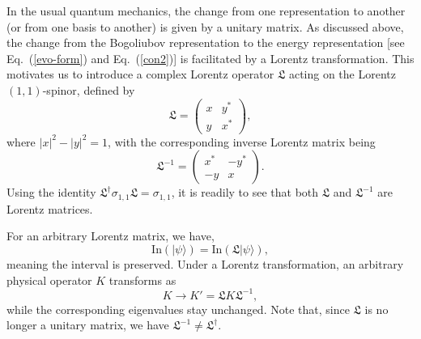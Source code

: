 \documentclass[pra,epsfig,rotate,superscriptaddress,showpacs]{revtex4}
\begin{document}
In the usual quantum mechanics, the change from one representation
to another (or from one basis to another) is given by a unitary matrix.
As discussed above,  the change  from the Bogoliubov
representation to the energy representation [see Eq.~(\ref{evo-form}) and Eq.~(\ref{con2})] is
facilitated by a Lorentz transformation. This motivates us to introduce a complex Lorentz operator $\mathfrak{L}$ acting on the Lorentz $(1,1)$-spinor, defined by
\begin{equation}\label{eq:L}
\mathfrak{L}=\left(\begin{array}{cc}x&y^* \\ y&x^*\end{array} \right),
\end{equation}
where $|x|^2-|y|^2=1$, with the corresponding inverse Lorentz matrix being
\begin{equation}
\mathfrak{L}^{-1}=\left(\begin{array}{cc}x^*&-y^* \\ -y&x\end{array} \right).
\end{equation}
Using the identity $\mathfrak{L}^\dag \sigma_{1,1}\mathfrak{L}=\sigma_{1,1}$, it is readily to see that both $\mathfrak{L}$ and $\mathfrak{L}^{-1}$ are Lorentz matrices.

For an arbitrary Lorentz matrix, we have,
\begin{equation}
{\text {In}}(|\psi\rangle)={\text {In}}(\mathfrak{L}|\psi\rangle),
\end{equation}
meaning the interval is preserved. Under a Lorentz transformation, an arbitrary physical operator $K$ transforms as
\begin{equation} \label{L-T-M}
K\rightarrow K'=\mathfrak{L}K\mathfrak{L}^{-1},
\end{equation}
while the corresponding eigenvalues stay unchanged. Note that, since $\mathfrak{L}$ is no longer a unitary matrix, we have $\mathfrak{L}^{-1}\neq\mathfrak{L}^{\dag}$.
\end{document}
